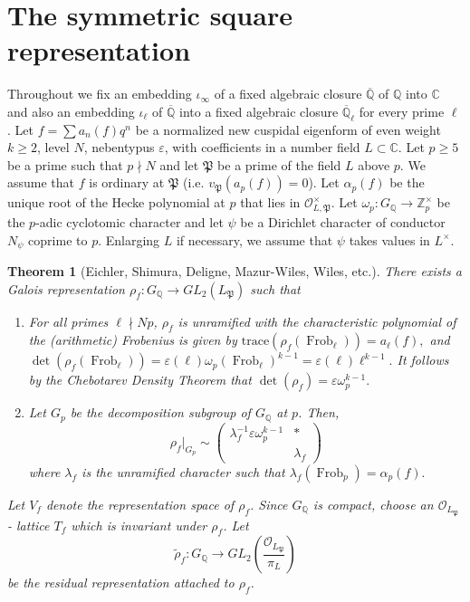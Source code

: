 \documentclass{amsart}
\newtheorem{theorem}{Theorem}[section]
\renewcommand{\geq}{\geqslant}
\newcommand{\C}{\mathbb{C}}
\newcommand{\Q}{\mathbb{Q}}
\newcommand{\Z}{\mathbb{Z}}
\newcommand{\Frob}{\operatorname{Frob}}
\newtheorem{auxiliary proposition}[theorem]{Auxiliary Proposition}
\newtheorem{main conjecture}[theorem]{Main Conjecture}
\newtheorem{main theorem}[theorem]{Main Theorem}
\newtheorem{modesty proposition}[theorem]{Modesty Proposition}
\newtheorem{open problem}[theorem]{Open Problem}
\newtheorem{convergence lemma}[theorem]{Convergence Lemma}
\newtheorem{corrected lemma}[theorem]{Corrected Lemma}
\newtheorem{growth lemma}[theorem]{Growth Lemma}
\newtheorem{coefficient lemma}[theorem]{Integrality Lemma}
\newtheorem{interpolation lemma}[theorem]{Interpolation Lemma}
\newtheorem{kernel lemma}[theorem]{Kernel Lemma}
\newtheorem{limit lemma}[theorem]{Limit Lemma}
\newtheorem{tandem lemma}[theorem]{Modesty Lemma}
\newtheorem{zero-finding lemma}[theorem]{Zero-Finding Lemma}
\begin{document}
\section{The symmetric square representation}\label{basics}
Throughout we fix an embedding $\iota_\infty$ of a fixed algebraic closure $\overline{\Q}$ of $\Q$ into $\C$ and also an embedding $\iota_\ell$ of $\overline{\Q}$ into a fixed algebraic closure $\overline{\Q}_{\ell}$ for every prime $\ell$. Let $f=\sum a_n(f)q^n$ be a normalized new cuspidal eigenform of even weight $k\geq 2$, level $N$, nebentypus $\varepsilon$, with coefficients in a number field $L \subset \mathbb{C}$.  Let $p \geq 5$ be a prime such that $p \nmid N$ and let $\mathfrak{P}$
be a prime of the field $L$ above $p$. We assume that $f$ is ordinary at $\mathfrak{P}$ (i.e. $v_{\mathfrak{P}}(a_p(f))=0$). Let $\alpha_p(f)$ be the unique root of the Hecke polynomial at $p$ that lies in $ \mathcal{O}^\times_{L,\mathfrak{P}}.$ Let $\omega_p: G_\Q \rightarrow \Z_p^\times$ be the $p$-adic cyclotomic character and let $\psi$ be a Dirichlet character of conductor $N_\psi$ coprime to $p$. Enlarging $L$ if necessary, we assume that $\psi$ takes values in $L^\times$. 
\begin{theorem}[Eichler, Shimura, Deligne, Mazur-Wiles, Wiles, etc.] \label{thm:modular}
There exists a Galois representation $\rho_f:G_\Q \longrightarrow GL_2(L_{\mathfrak{P}})$ such that 
\begin{enumerate}
    \item For all primes $\ell \nmid Np$, $\rho_f$ is unramified with the characteristic polynomial of the (arithmetic) Frobenius is given by 
    $\mathrm{trace}(\rho_f(\Frob_\ell))=a_\ell(f),$ and $\det(\rho_f(\Frob_\ell))=\varepsilon(\ell)\omega_p(\Frob_\ell)^{k-1}=\varepsilon(\ell)\ell^{k-1}.$ It follows by the Chebotarev Density Theorem that $\det(\rho_f)=\varepsilon\omega_p^{k-1}.$
    \item Let $G_p$ be the decomposition subgroup of $G_\Q$ at $p$. Then,
    $$\rho_f|_{G_p} \sim 
\begin{pmatrix}
\lambda_f^{-1}\varepsilon \omega_p^{k-1} & * \\
~ & \lambda_f
\end{pmatrix}$$
where $\lambda_f$ is the unramified character such that $\lambda_f(\Frob_p)=\alpha_p(f).$
\end{enumerate}
Let $V_f$ denote the representation space of $\rho_f$. Since $G_\Q$ is compact, choose an $\mathcal{O}_{L_\mathfrak{P}}$- lattice $T_f$ which is invariant under $\rho_f$. Let $$\tilde{\rho}_f: G_\Q \longrightarrow GL_2(\frac{\mathcal{O}_{L_\mathfrak{P}}}{\pi_L})$$ be the residual representation attached to $\rho_f$.
\end{theorem}
\end{document}
